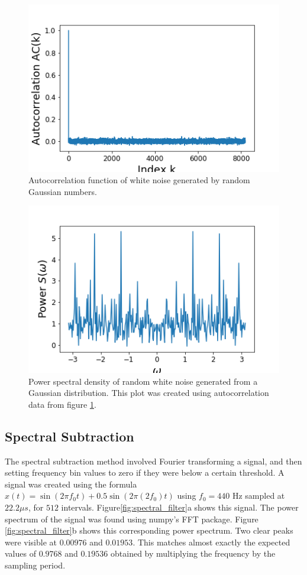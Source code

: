 \documentclass[twocolumn]{article}
\begin{document}
\begin{figure}
\centering
\includegraphics[width=\linewidth]{GaussianAC}
\caption{Autocorrelation function of white noise generated by random Gaussian numbers.}
\label{fig:GaussianAC}
\end{figure}

\begin{figure}
\centering
\includegraphics[width=\linewidth]{GaussianS}
\caption{Power spectral density of random white noise generated from a Gaussian distribution. This plot was created using autocorrelation data from figure \ref{fig:GaussianAC}.}
\label{fig:GaussianS}
\end{figure}


\subsection{Spectral Subtraction}
The spectral subtraction method involved Fourier transforming a signal, and then setting frequency bin values to zero if they were below a certain threshold. A signal was created using the formula $ x(t) = \sin (2\pi f_0t) + 0.5\sin (2\pi (2f_0)t)$ using $f_0=440$ Hz sampled at $22.2\mu s$, for $512$ intervals. Figure\ref{fig:spectral_filter}a shows this signal. The power spectrum of the signal was found using numpy's FFT package. Figure \ref{fig:spectral_filter}b shows this corresponding power spectrum. Two clear peaks were visible at $0.00976$ and $0.01953$. This matches almost exactly the expected values of $0.9768$ and $0.19536$ obtained by multiplying the frequency by the sampling period.
\end{document}
